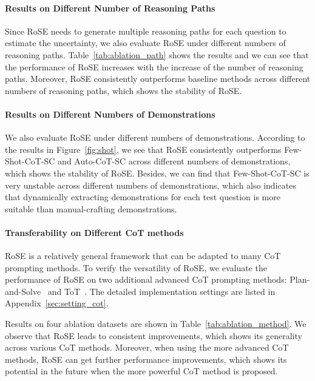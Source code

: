 \documentclass[11pt]{article}
\begin{document}
\paragraph{Results on Different Number of Reasoning Paths} Since RoSE needs to generate multiple reasoning paths for each question to estimate the uncertainty, we also evaluate RoSE under different numbers of reasoning paths. Table~\ref{tab:ablation_path} shows the results and we can see that the performance of RoSE increases with the increase of the number of reasoning paths. Moreover, RoSE consistently outperforms baseline methods across different numbers of reasoning paths, which shows the stability of RoSE.


\paragraph{Results on Different Numbers of Demonstrations} We also evaluate RoSE under different numbers of demonstrations. According to the results in Figure~\ref{fig:shot}, we see that RoSE consistently outperforms Few-Shot-CoT-SC and Auto-CoT-SC across different numbers of demonstrations, which shows the stability of RoSE. Besides, we can find that Few-Shot-CoT-SC is very unstable across different numbers of demonstrations, which also indicates that dynamically extracting demonstrations for each test question is more suitable than manual-crafting demonstrations. 

\paragraph{Transferability on Different CoT methods} RoSE is a relatively general framework that can be adapted to many CoT prompting methods. To verify the versatility of RoSE, we evaluate the performance of RoSE on two additional advanced CoT prompting methods: Plan-and-Solve~\cite{wang2023psp} and ToT~\cite{yao2023tot}. The detailed implementation settings are listed in Appendix~\ref{sec:setting_cot}.


Results on four ablation datasets are shown in Table~\ref{tab:ablation_method}. We observe that RoSE leads to consistent improvements, which shows its generality across various CoT methods. Moreover, when using the more advanced CoT methods, RoSE can get further performance improvements, which shows its potential in the future when the more powerful CoT method is proposed.
\end{document}
